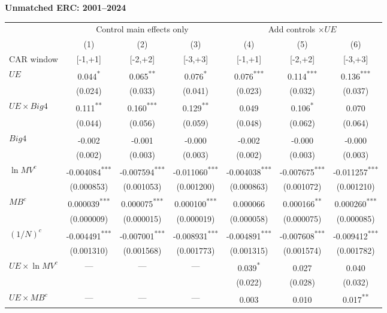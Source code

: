 \documentclass[10pt]{article}
\newcommand{\sym}[1]{\textsuperscript{#1}}
\begin{document}
\noindent\textbf{Unmatched ERC: 2001--2024}\par\medskip
\setlength{\tabcolsep}{4pt}\renewcommand{\arraystretch}{1.12}
\noindent\begin{tabular*}{\textwidth}{@{\extracolsep{\fill}}lcccccc@{}}\toprule
 & \multicolumn{3}{c}{Control main effects only} & \multicolumn{3}{c}{Add controls \(\times UE\)} \\
\cmidrule(lr){2-4}\cmidrule(lr){5-7}
 & (1) & (2) & (3) & (4) & (5) & (6) \\
CAR window & [-1,+1] & [-2,+2] & [-3,+3] & [-1,+1] & [-2,+2] & [-3,+3] \\\midrule
\(UE\) & 0.044\sym{*} & 0.065\sym{**} & 0.076\sym{*} & 0.076\sym{***} & 0.114\sym{***} & 0.136\sym{***} \\
 & (0.024) & (0.033) & (0.041) & (0.023) & (0.032) & (0.037) \\
\(UE\times Big4\) & 0.111\sym{**} & 0.160\sym{***} & 0.129\sym{**} & 0.049\sym{} & 0.106\sym{*} & 0.070\sym{} \\
 & (0.044) & (0.056) & (0.059) & (0.048) & (0.062) & (0.064) \\
\(Big4\) & -0.002\sym{} & -0.001\sym{} & -0.000\sym{} & -0.002\sym{} & -0.000\sym{} & -0.000\sym{} \\
 & (0.002) & (0.003) & (0.003) & (0.002) & (0.003) & (0.003) \\
\(\ln MV^c\) & -0.004084\sym{***} & -0.007594\sym{***} & -0.011060\sym{***} & -0.004038\sym{***} & -0.007675\sym{***} & -0.011257\sym{***} \\
 & (0.000853) & (0.001053) & (0.001200) & (0.000863) & (0.001072) & (0.001210) \\
\(MB^c\) & 0.000039\sym{***} & 0.000075\sym{***} & 0.000100\sym{***} & 0.000066\sym{} & 0.000166\sym{**} & 0.000260\sym{***} \\
 & (0.000009) & (0.000015) & (0.000019) & (0.000058) & (0.000075) & (0.000085) \\
\((1/N)^c\) & -0.004491\sym{***} & -0.007001\sym{***} & -0.008931\sym{***} & -0.004891\sym{***} & -0.007608\sym{***} & -0.009412\sym{***} \\
 & (0.001310) & (0.001568) & (0.001773) & (0.001315) & (0.001574) & (0.001782) \\
\(UE\times\ln MV^c\) & --- & --- & --- & 0.039\sym{*} & 0.027\sym{} & 0.040\sym{} \\
 &  &  &  & (0.022) & (0.028) & (0.032) \\
\(UE\times MB^c\) & --- & --- & --- & 0.003\sym{} & 0.010\sym{} & 0.017\sym{**} \\

\end{tabular*}
\end{document}
